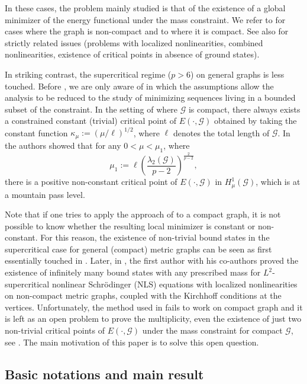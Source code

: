 \documentclass[10pt,a4paper]{article}
\theoremstyle{definition} \theoremstyle{remark}
\numberwithin{equation}{section}
\newcommand{\G}{\mathcal{G}}
\newcommand{\la}{\lambda}
\begin{document}
In these cases, the problem mainly studied is that of the existence of a global minimizer of the energy functional under the mass constraint.  We refer to \cite{ACFN, AST, AST2, AST4} for cases where the graph is non-compact and to \cite{CDS, Dov} where it is compact. See also \cite{DeDoGaSe, DeDoGaSeTr, DT, NP, PS, PSV, ST} for strictly related issues (problems with localized nonlinearities, combined nonlinearities, existence of critical points in absence of ground states).

In striking contrast, the supercritical regime ($p > 6$) on general graphs is less touched. Before \cite{CJS}, we are only aware of \cite{Ard} in which the assumptions allow the analysis to be reduced to the study of minimizing sequences living in a bounded subset of the constraint. In the setting of \cite{CJS} where $\G$ is compact, there always exists a constrained constant (trivial) critical point of $E(\cdot,\G)$ obtained by taking the constant function $\kappa_\mu := (\mu/\ell)^{1/2}$, where $\ell$ denotes the total length of $\G$. In  \cite{CJS} the authors showed that 
for any $0 < \mu < \mu_1$, where 
\begin{equation}\label{defmu1}
\mu_1:= \ell\left(\frac{\la_2(\G)}{p-2}\right) ^\frac2{p-2},
\end{equation}
there is a positive non-constant critical point of $E(\cdot,\G)$ in $H^1_\mu(\G)$, which is at a mountain pass level.

Note that if one tries to apply the approach of \cite{Ard} to a compact graph, it is not possible to know whether the resulting local minimizer is constant or non-constant. For this reason, the existence of non-trivial bound states in the supercritical case for general (compact) metric graphs can be seen as first essentially touched in \cite{CJS}. Later, in \cite{CGJT}, the first author with his co-authors  proved the existence of infinitely many bound states with any prescribed mass for $L^2$-supercritical nonlinear Schr\"odinger (NLS) equations with localized nonlinearities on non-compact metric graphs, coupled with the Kirchhoff conditions at the vertices. Unfortunately, the method used in \cite{CGJT} fails to work on compact graph  and it is left as an open problem to prove the multiplicity, even the existence of just two non-trivial critical points of $E(\cdot,\G)$ under the mass constraint for compact $\G$, see \cite[Remark 1.5]{CGJT}. The main motivation of this paper is to solve this open question.


\subsection*{Basic notations and main result}
\end{document}
